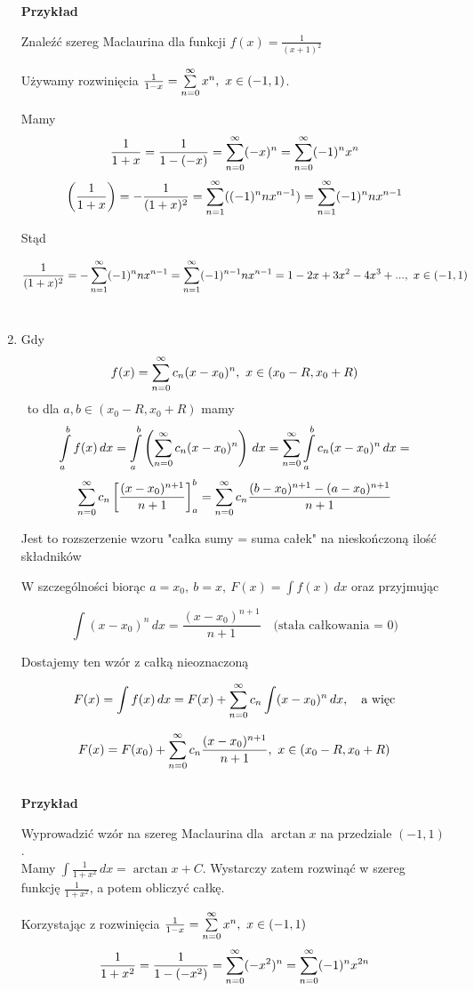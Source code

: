 \begin{enumerate}
    \textbf{Przykład}

    Znaleźć szereg Maclaurina dla funkcji $ f(x) = \frac{1}{(x+1)^2} $

    Używamy rozwinięcia $ \frac{1}{1-x} = \sum\limits_{n = 0}^{\infty} x^n, \ x \in (-1, 1) $.
    
    Mamy
    $$ \frac{1}{1+x} = \frac{1}{1-(-x)} = \sum\limits_{n = 0}^{\infty} (-x)^n = \sum\limits_{n = 0}^{\infty} (-1)^n x^n $$
    $$ \left( \frac{1}{1+x} \right) = - \frac{1}{(1+x)^2} = \sum\limits_{n = 1}^{\infty} ((-1)^n n x^{n-1}) = \sum\limits_{n = 1}^{\infty} (-1)^n n x^{n-1} $$

    Stąd

    $$ \frac{1}{(1+x)^2} = - \sum\limits_{n = 1}^{\infty} (-1)^n n x^{n-1} = \sum\limits_{n = 1}^{\infty} (-1)^{n-1} n x^{n-1} = 1 - 2x + 3x^2 - 4x^3 + ..., \ x \in (-1, 1) $$ \\

    \item Gdy $$ f(x) = \sum\limits_{n = 0}^{\infty} c_n(x - x_0)^n, \ x\in (x_0 - R, x_0 + R) $$ \ 
    to dla $ a,b \in (x_0 - R, x_0 + R) $ mamy
    $$ \int\limits_a^b f(x) \,dx = \int\limits_a^b \left( \sum\limits_{n = 0}^{\infty} c_n(x - x_0)^n \right) \,dx = \sum\limits_{n = 0}^{\infty} \int\limits_a^b c_n(x - x_0)^n \,dx = $$ 
    $$ \sum\limits_{n = 0}^{\infty} c_n \left[ \frac{(x - x_0)^{n+1}}{n+1} \right]_a^b = \sum\limits_{n = 0}^{\infty} c_n \frac{(b - x_0)^{n+1} - (a - x_0)^{n+1}}{n+1} $$

    Jest to rozszerzenie wzoru "całka sumy = suma całek" na nieskończoną ilość składników

    W szczególności biorąc $ a = x_0, \ b = x, \ F(x) = \int f(x) \,dx $ oraz przyjmując 

    $$ \int (x - x_0)^n \,dx = \frac{(x - x_0)^{n+1}}{n+1} \quad \textrm{(stała całkowania = 0)} $$

    Dostajemy ten wzór z całką nieoznaczoną

    $$ F(x) = \int f(x) \,dx = F(x) + \sum\limits_{n = 0}^{\infty} c_n \int (x - x_0)^n \,dx, \quad \textrm{a więc} $$

    $$ F(x) = F(x_0) + \sum\limits_{n = 0}^{\infty} c_n \frac{(x - x_0)^{n+1}}{n+1}, \ x\in (x_0 - R, x_0 + R) $$ \\

    \textbf{Przykład}

    Wyprowadzić wzór na szereg Maclaurina dla $\arctan x$ na przedziale $(-1, 1)$. \\

    Mamy $ \int \frac{1}{1+x^2} \,dx = \arctan x + C $. Wystarczy zatem rozwinąć w szereg funkcję $ \frac{1}{1+x^2} $, a potem obliczyć całkę.

    Korzystając z rozwinięcia $ \frac{1}{1-x} = \sum\limits_{n = 0}^{\infty} x^n, \ x\in(-1, 1) $
    $$ \frac{1}{1+x^2} = \frac{1}{1 - (-x^2)} = \sum\limits_{n = 0}^{\infty} (-x^2)^n = \sum\limits_{n = 0}^{\infty} (-1)^n x^{2n}$$


\end{enumerate}
